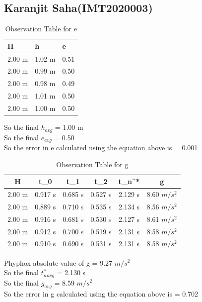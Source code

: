 \documentclass[11pt]{scrartcl} %
\begin{document}
\newpage
\subsection{Karanjit Saha(IMT2020003)}

\begin{table}[h] %
	\centering %
	\begin{tabular}{l l l}
		\toprule
		\textbf{H} & \textbf{h} & \textbf{e} \\
		\midrule
		2.00 m & 1.02 m & 0.51\\
		2.00 m & 0.99 m  & 0.50\\
		2.00 m & 0.98 m  & 0.49\\
		2.00 m & 1.01 m & 0.50 \\
		2.00 m & 1.00 m & 0.50 \\
		\bottomrule
	\end{tabular}
	\caption{Observation Table for e}
\end{table}
So the final $h_{avg}$ = 1.00 m\\
So the final $e_{avg}$ = 0.50\\
So the error in e calculated using the equation above is  = 0.001 

\begin{table}[h]
\centering
\begin{tabular}{||c c c c c c||} 
\toprule
 \hline
 H & t_0 & t_1 & t_2 & t_n^* & g \\ [0.5ex] 
 \midrule
 \hline\hline
 2.00 m & 0.917 s & 0.685 s  & 0.527 s & 2.129 s & 8.60 $m/s^2$  \\ 
 \hline
 2.00 m & 0.889 s & 0.710 s & 0.535 s & 2.134 s & 8.56 $m/s^2$  \\
 \hline
 2.00 m & 0.916 s & 0.681 s & 0.530 s & 2.127 s  & 8.61 $m/s^2$   \\
 \hline
 2.00 m & 0.912 s & 0.700 s & 0.519 s & 2.131 s  & 8.58 $m/s^2$   \\
 \hline
 2.00 m & 0.910 s & 0.690 s & 0.531 s & 2.131 s  & 8.58 $m/s^2$  \\ [1ex] 
 \bottomrule
 \hline
\end{tabular}
\caption{Observation Table for g}
\end{table}
Phyphox absolute value of g = 9.27 $m/s^2$\\
So the final $t_n^*_{avg}$ = 2.130 s\\
So the final $g_{avg}$ = 8.59 $m/s^2$\\
So the error in g calculated using the equation above is  = 0.702
\end{document}
